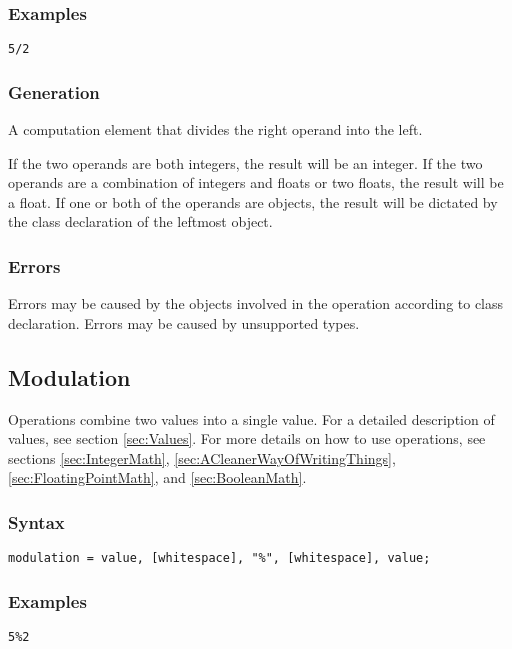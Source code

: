 \documentclass[10pt,a4paper]{article}
\begin{document}
\subsubsection{Examples}
\begin{verbatim}
5/2
\end{verbatim}

\subsubsection{Generation}
A computation element that divides the right operand into the left.

If the two operands are both integers, the result will be an integer. If the two operands are a combination of integers and floats or two floats, the result will be a float. If one or both of the operands are objects, the result will be dictated by the class declaration of the leftmost object.

\subsubsection{Errors}
Errors may be caused by the objects involved in the operation according to class declaration. Errors may be caused by unsupported types.

\newpage




\subsection{Modulation}
Operations combine two values into a single value. For a detailed description of values, see section \ref{sec:Values}. For more details on how to use operations, see sections \ref{sec:IntegerMath}, \ref{sec:ACleanerWayOfWritingThings}, \ref{sec:FloatingPointMath}, and \ref{sec:BooleanMath}.

\subsubsection{Syntax}
\begin{verbatim}
modulation = value, [whitespace], "%", [whitespace], value;
\end{verbatim}

\subsubsection{Examples}
\begin{verbatim}
5%2
\end{verbatim}
\end{document}
